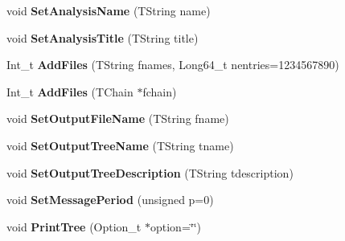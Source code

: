 \begin{DoxyCompactItemize}
\item 
\hypertarget{class_h_a_l_1_1_analysis_abcbdb0f6cad2060cf3f6bca7d0eb9ada}{void {\bfseries Set\+Analysis\+Name} (T\+String name)}\label{class_h_a_l_1_1_analysis_abcbdb0f6cad2060cf3f6bca7d0eb9ada}

\item 
\hypertarget{class_h_a_l_1_1_analysis_ab4ecf4f7c5c29027ac3eb3e3a2e3a780}{void {\bfseries Set\+Analysis\+Title} (T\+String title)}\label{class_h_a_l_1_1_analysis_ab4ecf4f7c5c29027ac3eb3e3a2e3a780}

\item 
\hypertarget{class_h_a_l_1_1_analysis_a540cf522be42290e16d6ac0c7dbff0ba}{Int\+\_\+t {\bfseries Add\+Files} (T\+String fnames, Long64\+\_\+t nentries=1234567890)}\label{class_h_a_l_1_1_analysis_a540cf522be42290e16d6ac0c7dbff0ba}

\item 
\hypertarget{class_h_a_l_1_1_analysis_af8fccc1f3c27d6402ecad559648b7ff0}{Int\+\_\+t {\bfseries Add\+Files} (T\+Chain $\ast$fchain)}\label{class_h_a_l_1_1_analysis_af8fccc1f3c27d6402ecad559648b7ff0}

\item 
\hypertarget{class_h_a_l_1_1_analysis_a9e6b12787599c0c36f576350e2e93b8d}{void {\bfseries Set\+Output\+File\+Name} (T\+String fname)}\label{class_h_a_l_1_1_analysis_a9e6b12787599c0c36f576350e2e93b8d}

\item 
\hypertarget{class_h_a_l_1_1_analysis_a50f84d17528b7ba7621c65696dd81e75}{void {\bfseries Set\+Output\+Tree\+Name} (T\+String tname)}\label{class_h_a_l_1_1_analysis_a50f84d17528b7ba7621c65696dd81e75}

\item 
\hypertarget{class_h_a_l_1_1_analysis_a6461758cc06f7a334a487d857172983a}{void {\bfseries Set\+Output\+Tree\+Description} (T\+String tdescription)}\label{class_h_a_l_1_1_analysis_a6461758cc06f7a334a487d857172983a}

\item 
\hypertarget{class_h_a_l_1_1_analysis_a4561423621e94e5593694df20f7b9c60}{void {\bfseries Set\+Message\+Period} (unsigned p=0)}\label{class_h_a_l_1_1_analysis_a4561423621e94e5593694df20f7b9c60}

\item 
\hypertarget{class_h_a_l_1_1_analysis_afccfbae795035cfe75578fa805aefa93}{void {\bfseries Print\+Tree} (Option\+\_\+t $\ast$option=\char`\"{}\char`\"{})}\label{class_h_a_l_1_1_analysis_afccfbae795035cfe75578fa805aefa93}


\end{DoxyCompactItemize}
